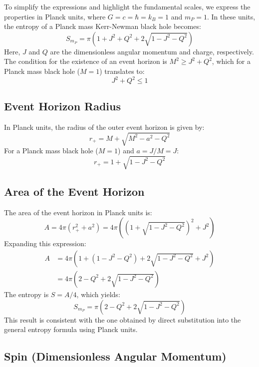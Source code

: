 	To simplify the expressions and highlight the fundamental scales, we express the properties in Planck units, where $G = c = \hbar = k_B = 1$ and $m_P = 1$. In these units, the entropy of a Planck mass Kerr-Newman black hole becomes:
	$$S_{m_P} = \pi \left( 1 + J^2 + Q^2 + 2 \sqrt{1 - J^2 - Q^2} \right)$$
	Here, $J$ and $Q$ are the dimensionless angular momentum and charge, respectively. The condition for the existence of an event horizon is $M^2 \ge J^2 + Q^2$, which for a Planck mass black hole ($M=1$) translates to:
	\begin{equation}
		J^2 + Q^2 \le 1
		\label{eq:horizon_condition}
	\end{equation}
	
	\subsection{Event Horizon Radius}
	
	In Planck units, the radius of the outer event horizon is given by:
	$$r_+ = M + \sqrt{M^2 - a^2 - Q^2}$$
	For a Planck mass black hole ($M=1$) and $a = J/M = J$:
	\begin{equation}
		r_+ = 1 + \sqrt{1 - J^2 - Q^2}
		\label{eq:horizon_radius}
	\end{equation}
	
	\subsection{Area of the Event Horizon}
	
	The area of the event horizon in Planck units is:
	$$A = 4 \pi (r_+^2 + a^2) = 4 \pi \left( (1 + \sqrt{1 - J^2 - Q^2})^2 + J^2 \right)$$
	Expanding this expression:
	\begin{align*}
		A &= 4 \pi \left( 1 + (1 - J^2 - Q^2) + 2 \sqrt{1 - J^2 - Q^2} + J^2 \right) \\
		&= 4 \pi \left( 2 - Q^2 + 2 \sqrt{1 - J^2 - Q^2} \right)
	\end{align*}
	The entropy is $S = A / 4$, which yields:
	\begin{equation}
		S_{m_P} = \pi \left( 2 - Q^2 + 2 \sqrt{1 - J^2 - Q^2} \right)
		\label{eq:entropy_planck_units}
	\end{equation}
	This result is consistent with the one obtained by direct substitution into the general entropy formula using Planck units.
	
	\subsection{Spin (Dimensionless Angular Momentum)}
	
